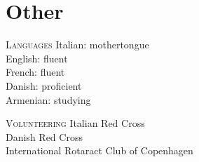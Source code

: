 \section*{Other}

\begin{paracol}{2}
  \textsc{Languages}
\switchcolumn
  Italian: mothertongue\\
  English: fluent\\
  French: fluent\\
  Danish: proficient\\
  Armenian: studying
\end{paracol}

\vspace{1em}

\begin{paracol}{2}
  \textsc{Volunteering}
\switchcolumn
  Italian Red Cross\\
  Danish Red Cross\\
  International Rotaract Club of Copenhagen
\end{paracol}